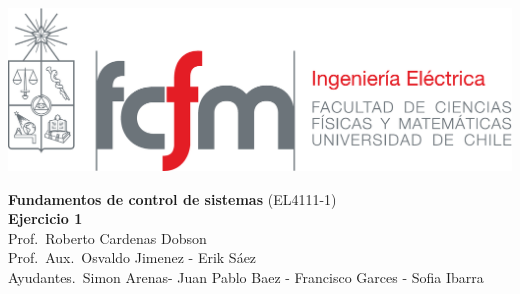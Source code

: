 \documentclass[
  11pt,
  letterpaper,
   addpoints,
  ]{exam}
\begin{document}
\noindent
\begin{minipage}{0.47\textwidth}
\includegraphics[width=\textwidth]{../fcfm_die}
\end{minipage}
\begin{minipage}{0.53\textwidth}
\begin{center} 
\large\textbf{Fundamentos de control de sistemas} (EL4111-1) \\
\large\textbf{Ejercicio 1} \\
\small Prof.~Roberto Cardenas Dobson\\
\small Prof.~Aux.~Osvaldo Jimenez - Erik Sáez\\
\small Ayudantes.~Simon Arenas- Juan Pablo Baez - Francisco Garces - Sofia Ibarra\\
\end{center}
\end{minipage}
\end{document}
